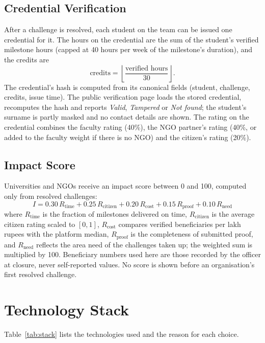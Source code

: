 \subsection{Credential Verification}
After a challenge is resolved, each student on the team can be issued one credential for it. The hours on the credential are the sum of the student's verified milestone hours (capped at 40 hours per week of the milestone's duration), and the credits are
\begin{equation}
\text{credits} = \left\lfloor \frac{\text{verified hours}}{30} \right\rfloor .
\end{equation}
The credential's hash is computed from its canonical fields (student, challenge, credits, issue time). The public verification page loads the stored credential, recomputes the hash and reports \emph{Valid}, \emph{Tampered} or \emph{Not found}; the student's surname is partly masked and no contact details are shown. The rating on the credential combines the faculty rating (40\%), the NGO partner's rating (40\%, or added to the faculty weight if there is no NGO) and the citizen's rating (20\%).

\subsection{Impact Score}
Universities and NGOs receive an impact score between 0 and 100, computed only from resolved challenges:
\begin{equation}
I = 0.30\,R_{\text{time}} + 0.25\,R_{\text{citizen}} + 0.20\,R_{\text{cost}} + 0.15\,R_{\text{proof}} + 0.10\,R_{\text{need}}
\end{equation}
where $R_{\text{time}}$ is the fraction of milestones delivered on time, $R_{\text{citizen}}$ is the average citizen rating scaled to $[0,1]$, $R_{\text{cost}}$ compares verified beneficiaries per lakh rupees with the platform median, $R_{\text{proof}}$ is the completeness of submitted proof, and $R_{\text{need}}$ reflects the area need of the challenges taken up; the weighted sum is multiplied by 100. Beneficiary numbers used here are those recorded by the officer at closure, never self-reported values. No score is shown before an organisation's first resolved challenge.

\section{Technology Stack}
Table~\ref{tab:stack} lists the technologies used and the reason for each choice.


